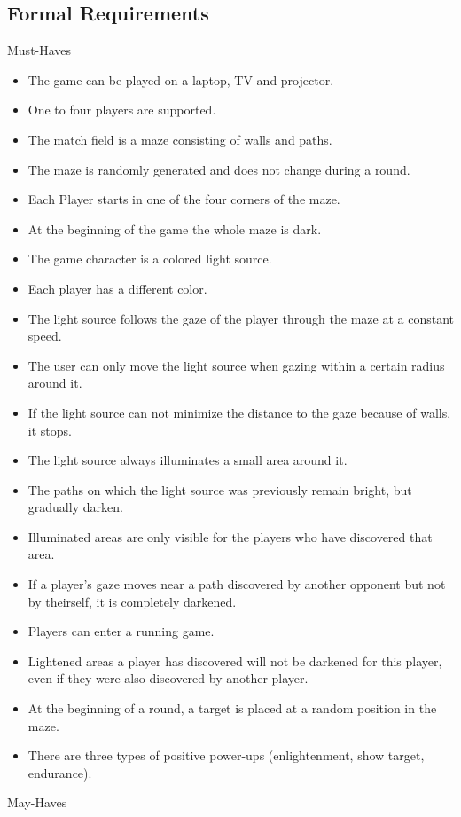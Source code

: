 \documentclass{sigchi}
\begin{document}
\subsection{Formal Requirements}
	Must-Haves
	\begin{itemize}
		\item The game can be played on a laptop, TV and projector.
		\item One to four players are supported. 
		\item The match field is a maze consisting of walls and paths.
		\item The maze is randomly generated and does not change during a round.
		\item Each Player starts in one of the four corners of the maze.
		\item At the beginning of the game the whole maze is dark.
		\item The game character is a colored light source.
		\item Each player has a different color.
		\item The light source follows the gaze of the player through the maze at a constant speed.
		\item The user can only move the light source when gazing within a certain radius around it.
		\item If the light source can not minimize the distance to the gaze because of walls, it stops.
		\item The light source always illuminates a small area around it.
		\item The paths on which the light source was previously remain bright, but gradually darken.
		\item Illuminated areas are only visible for the players who have discovered that area.
		\item If a player's gaze moves near a path discovered by another opponent but not by theirself, it is completely darkened. 
		\item Players can enter a running game.
		\item Lightened areas a player has discovered will not be darkened for this player, even if they were also discovered by another player.
		\item At the beginning of a round, a target is placed at a random position in the maze.
		\item There are three types of positive power-ups (enlightenment, show target, endurance).
	\end{itemize}
	May-Haves
\end{document}

